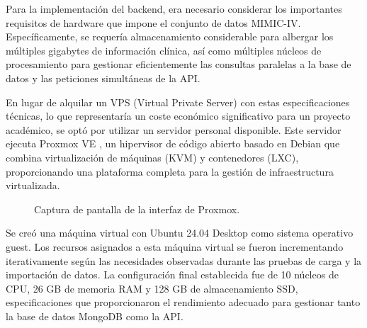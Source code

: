 Para la implementación del backend, era necesario considerar los importantes requisitos de hardware que impone el conjunto de datos MIMIC-IV. Específicamente, se requería almacenamiento considerable para albergar los múltiples gigabytes de información clínica, así como múltiples núcleos de procesamiento para gestionar eficientemente las consultas paralelas a la base de datos y las peticiones simultáneas de la API.

En lugar de alquilar un VPS (Virtual Private Server) con estas especificaciones técnicas, lo que representaría un coste económico significativo para un proyecto académico, se optó por utilizar un servidor personal disponible. Este servidor ejecuta Proxmox VE \cite{proxmox}, un hipervisor de código abierto basado en Debian que combina virtualización de máquinas (KVM) y contenedores (LXC), proporcionando una plataforma completa para la gestión de infraestructura virtualizada.


\begin{figure}[H]
  \centering
  \caption{Captura de pantalla de la interfaz de Proxmox.}
  \label{fig:proxmox2}
\end{figure}



Se creó una máquina virtual con Ubuntu 24.04 Desktop como sistema operativo guest. Los recursos asignados a esta máquina virtual se fueron incrementando iterativamente según las necesidades observadas durante las pruebas de carga y la importación de datos. La configuración final establecida fue de 10 núcleos de CPU, 26 GB de memoria RAM y 128 GB de almacenamiento SSD, especificaciones que proporcionaron el rendimiento adecuado para gestionar tanto la base de datos MongoDB como la API.

